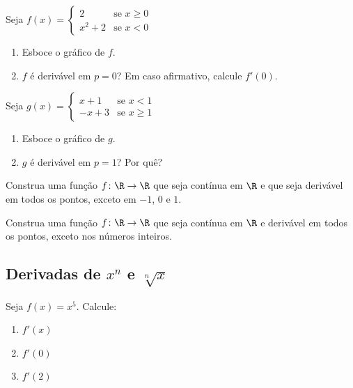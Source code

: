\begin{exercicio}[16]
Seja $f(x) = \begin{cases} 2 & \text{se } x \ge 0 \\ x^2 + 2 & \text{se } x < 0 \end{cases}$
\begin{enumerate}[label=\alph*)]
    \item Esboce o gráfico de $f$.
    \item $f$ é derivável em $p = 0$? Em caso afirmativo, calcule $f'(0)$.
\end{enumerate}
\end{exercicio}

\begin{exercicio}[17]
Seja $g(x) = \begin{cases} x + 1 & \text{se } x < 1 \\ -x + 3 & \text{se } x \ge 1 \end{cases}$
\begin{enumerate}[label=\alph*)]
    \item Esboce o gráfico de $g$.
    \item $g$ é derivável em $p = 1$? Por quê?
\end{enumerate}
\end{exercicio}

\begin{exercicio}[18]
Construa uma função $f\colon \R \to \R$ que seja contínua em $\R$ e que seja derivável em todos os pontos, exceto em $-1$, $0$ e $1$.
\end{exercicio}

\begin{exercicio}[19]
Construa uma função $f\colon \R \to \R$ que seja contínua em $\R$ e derivável em todos os pontos, exceto nos números inteiros.
\end{exercicio}

\clearpage

\subsection{Derivadas de $x^n$ e $\sqrt[n]{x}$}

\begin{exercicio}[1]
Seja $f(x) = x^5$. Calcule:
\begin{enumerate}[label=\alph*)]
    \item $f'(x)$
    \item $f'(0)$
    \item $f'(2)$
\end{enumerate}
\end{exercicio}


